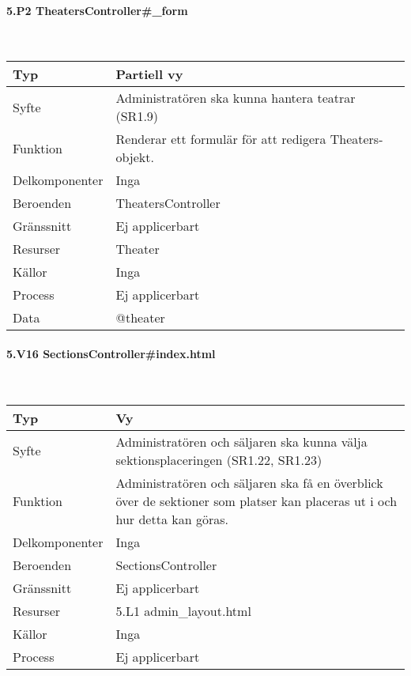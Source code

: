 \documentclass[a4paper, twoside, 11pt, titlepage]{article}
\begin{document}
			\paragraph{5.P2 TheatersController\#\_form}\

			\begin {table} [ht] \begin{tabular} {  p{3.5cm} p{9.6cm} }
				\hline
				Typ & Partiell vy  \\
				\hline
				Syfte & Administratören ska kunna hantera teatrar (SR1.9)  \\
				\hline
				Funktion & Renderar ett formulär för att redigera Theaters-objekt.  \\
				\hline
				Delkomponenter & Inga  \\
				\hline
				Beroenden & TheatersController  \\
				\hline
				Gränssnitt & Ej applicerbart  \\
				\hline
				Resurser & Theater  \\
				\hline
				Källor & Inga  \\
				\hline
				Process & Ej applicerbart  \\
				\hline
				Data & @theater  \\
				\hline
			\end{tabular} \end{table} \FloatBarrier


			\paragraph{5.V16 SectionsController\#index.html}\

			\begin {table} [ht] \begin{tabular} {  p{3.5cm} p{9.6cm} }
				\hline
				Typ & Vy  \\
				\hline
				Syfte & Administratören och säljaren ska kunna välja sektionsplaceringen (SR1.22, SR1.23)  \\
				\hline
				Funktion & Administratören och säljaren ska få en överblick över de sektioner som platser kan placeras ut i och hur detta kan göras.  \\
				\hline
				Delkomponenter & Inga  \\
				\hline
				Beroenden & SectionsController  \\
				\hline
				Gränssnitt & Ej applicerbart  \\
				\hline
				Resurser & 5.L1 admin\_layout.html  \\
				\hline
				Källor & Inga  \\
				\hline
				Process & Ej applicerbart  \\
				\hline
			\end{tabular} \end{table} \FloatBarrier
			\vspace{6mm}
\end{document}
